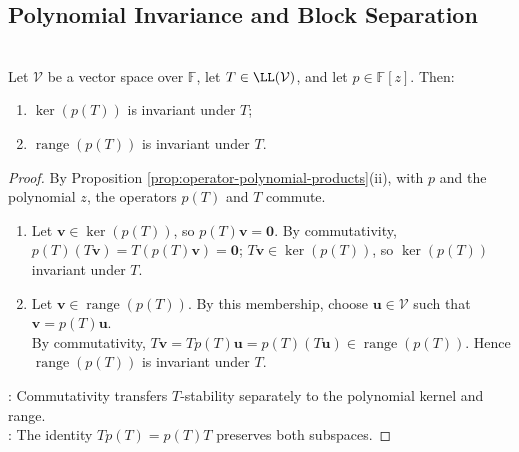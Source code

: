 \subsection{Polynomial Invariance and Block Separation}
\begin{proposition} \label{prop:kernel-range-polynomial-in-operator-invariant} \\
Let $\mathcal{V}$ be a vector space over $\mathbb{F}$, let $T\in\LL(\mathcal{V})$, and let $p\in\mathbb{F}[z]$. Then:
\begin{enumerate}[label=(\roman*)]
\setlength{\itemsep}{0pt}
\item $\ker(p(T))$ is invariant under $T$;
\item $\operatorname{range}(p(T))$ is invariant under $T$.
\end{enumerate}
\begin{proof}
By Proposition \ref{prop:operator-polynomial-products}(ii), with $p$ and the polynomial $z$, the operators $p(T)$ and $T$ commute.
\begin{enumerate}[label=(\roman*)]
\setlength{\itemsep}{0pt}
\item Let $\mathbf{v}\in\ker(p(T))$, so $p(T)\mathbf{v}=\mathbf{0}$. By commutativity, $p(T)(T\mathbf{v})=T(p(T)\mathbf{v})=\mathbf{0}$; $T\mathbf{v}\in\ker(p(T))$, so $\ker(p(T))$ invariant under $T$.
\item Let $\mathbf{v}\in\operatorname{range}(p(T))$. By this membership, choose $\mathbf{u}\in\mathcal{V}$ such that $\mathbf{v}=p(T)\mathbf{u}$.\\
By commutativity, $T\mathbf{v}=Tp(T)\mathbf{u}=p(T)(T\mathbf{u})\in\operatorname{range}(p(T))$. Hence $\operatorname{range}(p(T))$ is invariant under $T$.
\end{enumerate}
: Commutativity transfers $T$-stability separately to the polynomial kernel and range.\\
: The identity $Tp(T)=p(T)T$ preserves both subspaces.
\end{proof}
\end{proposition}

